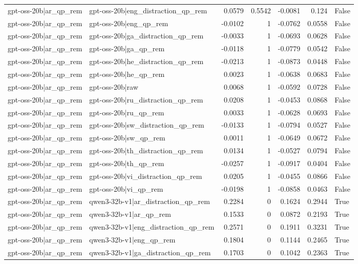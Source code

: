 \begin{table}
\begin{tabular}{l l r r r r l}
gpt-oss-20b|ar_qp_rem & gpt-oss-20b|eng_distraction_qp_rem & 0.0579 & 0.5542 & -0.0081 & 0.124 & False \\
gpt-oss-20b|ar_qp_rem & gpt-oss-20b|eng_qp_rem & -0.0102 & 1 & -0.0762 & 0.0558 & False \\
gpt-oss-20b|ar_qp_rem & gpt-oss-20b|ga_distraction_qp_rem & -0.0033 & 1 & -0.0693 & 0.0628 & False \\
gpt-oss-20b|ar_qp_rem & gpt-oss-20b|ga_qp_rem & -0.0118 & 1 & -0.0779 & 0.0542 & False \\
gpt-oss-20b|ar_qp_rem & gpt-oss-20b|he_distraction_qp_rem & -0.0213 & 1 & -0.0873 & 0.0448 & False \\
gpt-oss-20b|ar_qp_rem & gpt-oss-20b|he_qp_rem & 0.0023 & 1 & -0.0638 & 0.0683 & False \\
gpt-oss-20b|ar_qp_rem & gpt-oss-20b|raw & 0.0068 & 1 & -0.0592 & 0.0728 & False \\
gpt-oss-20b|ar_qp_rem & gpt-oss-20b|ru_distraction_qp_rem & 0.0208 & 1 & -0.0453 & 0.0868 & False \\
gpt-oss-20b|ar_qp_rem & gpt-oss-20b|ru_qp_rem & 0.0033 & 1 & -0.0628 & 0.0693 & False \\
gpt-oss-20b|ar_qp_rem & gpt-oss-20b|sw_distraction_qp_rem & -0.0133 & 1 & -0.0794 & 0.0527 & False \\
gpt-oss-20b|ar_qp_rem & gpt-oss-20b|sw_qp_rem & 0.0011 & 1 & -0.0649 & 0.0672 & False \\
gpt-oss-20b|ar_qp_rem & gpt-oss-20b|th_distraction_qp_rem & 0.0134 & 1 & -0.0527 & 0.0794 & False \\
gpt-oss-20b|ar_qp_rem & gpt-oss-20b|th_qp_rem & -0.0257 & 1 & -0.0917 & 0.0404 & False \\
gpt-oss-20b|ar_qp_rem & gpt-oss-20b|vi_distraction_qp_rem & 0.0205 & 1 & -0.0455 & 0.0866 & False \\
gpt-oss-20b|ar_qp_rem & gpt-oss-20b|vi_qp_rem & -0.0198 & 1 & -0.0858 & 0.0463 & False \\
gpt-oss-20b|ar_qp_rem & qwen3-32b-v1|ar_distraction_qp_rem & 0.2284 & 0 & 0.1624 & 0.2944 & True \\
gpt-oss-20b|ar_qp_rem & qwen3-32b-v1|ar_qp_rem & 0.1533 & 0 & 0.0872 & 0.2193 & True \\
gpt-oss-20b|ar_qp_rem & qwen3-32b-v1|eng_distraction_qp_rem & 0.2571 & 0 & 0.1911 & 0.3231 & True \\
gpt-oss-20b|ar_qp_rem & qwen3-32b-v1|eng_qp_rem & 0.1804 & 0 & 0.1144 & 0.2465 & True \\
gpt-oss-20b|ar_qp_rem & qwen3-32b-v1|ga_distraction_qp_rem & 0.1703 & 0 & 0.1042 & 0.2363 & True \\

\end{tabular}
\end{table}
